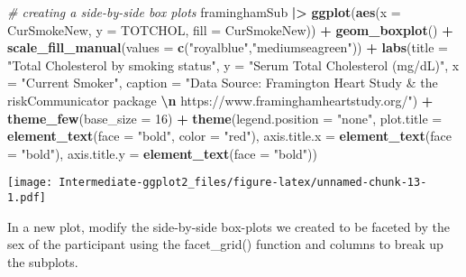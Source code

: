 \documentclass[
]{article}
\newenvironment{Shaded}{\begin{snugshade}}{\end{snugshade}}
\newcommand{\AttributeTok}[1]{\textcolor[rgb]{0.13,0.29,0.53}{#1}}
\newcommand{\CommentTok}[1]{\textcolor[rgb]{0.56,0.35,0.01}{\textit{#1}}}
\newcommand{\DecValTok}[1]{\textcolor[rgb]{0.00,0.00,0.81}{#1}}
\newcommand{\FunctionTok}[1]{\textcolor[rgb]{0.13,0.29,0.53}{\textbf{#1}}}
\newcommand{\NormalTok}[1]{#1}
\newcommand{\SpecialCharTok}[1]{\textcolor[rgb]{0.81,0.36,0.00}{\textbf{#1}}}
\newcommand{\StringTok}[1]{\textcolor[rgb]{0.31,0.60,0.02}{#1}}
\begin{document}
\begin{Shaded}
\begin{Highlighting}[]
\CommentTok{\# creating a side{-}by{-}side box plots}
\NormalTok{framinghamSub }\SpecialCharTok{|\textgreater{}}
  \FunctionTok{ggplot}\NormalTok{(}\FunctionTok{aes}\NormalTok{(}\AttributeTok{x =}\NormalTok{ CurSmokeNew, }\AttributeTok{y =}\NormalTok{ TOTCHOL, }\AttributeTok{fill =}\NormalTok{ CurSmokeNew)) }\SpecialCharTok{+}
  \FunctionTok{geom\_boxplot}\NormalTok{() }\SpecialCharTok{+}
  \FunctionTok{scale\_fill\_manual}\NormalTok{(}\AttributeTok{values =} \FunctionTok{c}\NormalTok{(}\StringTok{"royalblue"}\NormalTok{,}\StringTok{"mediumseagreen"}\NormalTok{)) }\SpecialCharTok{+}
  \FunctionTok{labs}\NormalTok{(}\AttributeTok{title =} \StringTok{"Total Cholesterol by smoking status"}\NormalTok{,}
       \AttributeTok{y =} \StringTok{"Serum Total Cholesterol (mg/dL)"}\NormalTok{,}
       \AttributeTok{x =} \StringTok{"Current Smoker"}\NormalTok{,}
       \AttributeTok{caption =} \StringTok{"Data Source: Framington Heart Study \& the riskCommunicator package }\SpecialCharTok{\textbackslash{}n}\StringTok{ https://www.framinghamheartstudy.org/"}\NormalTok{) }\SpecialCharTok{+}
  \FunctionTok{theme\_few}\NormalTok{(}\AttributeTok{base\_size =} \DecValTok{16}\NormalTok{) }\SpecialCharTok{+}
  \FunctionTok{theme}\NormalTok{(}\AttributeTok{legend.position =} \StringTok{"none"}\NormalTok{, }
        \AttributeTok{plot.title =} \FunctionTok{element\_text}\NormalTok{(}\AttributeTok{face =} \StringTok{"bold"}\NormalTok{, }\AttributeTok{color =} \StringTok{"red"}\NormalTok{),}
        \AttributeTok{axis.title.x =} \FunctionTok{element\_text}\NormalTok{(}\AttributeTok{face =} \StringTok{"bold"}\NormalTok{),}
        \AttributeTok{axis.title.y =} \FunctionTok{element\_text}\NormalTok{(}\AttributeTok{face =} \StringTok{"bold"}\NormalTok{))}
\end{Highlighting}
\end{Shaded}

\texttt{[image: Intermediate-ggplot2\_files/figure-latex/unnamed-chunk-13-1.pdf]}

In a new plot, modify the side-by-side box-plots we created to be
faceted by the sex of the participant using the facet\_grid() function
and columns to break up the subplots.
\end{document}
